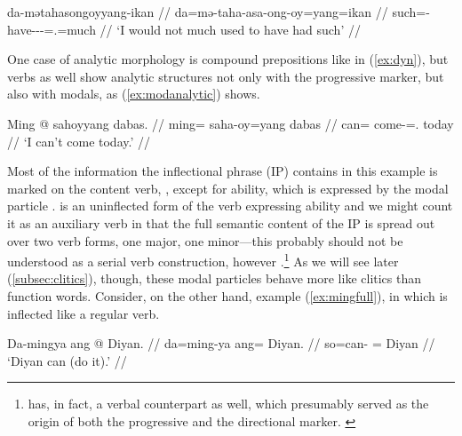 \ex\label{ex:footlong}\begingl
	\gla da-mətahasongoyyang-ikan //
	\glb da=mə-taha-asa-ong-oy=yang=ikan //
	\glc such=\Pst{}-have-\Hab{}-\Irr{}-\Neg{}=\Fsg{}.\Aarg{}=much //
	\glft `I would not much used to have had such' //
\endgl\xe

One case of analytic morphology is compound prepositions like  in (\ref{ex:dyn}), but verbs as well show analytic
structures not only with the progressive marker, but also with modals, as
(\ref{ex:modanalytic}) shows.

\ex\label{ex:modanalytic}%
\begingl
	\gla Ming @ sahoyyang dabas. //
	\glb ming= saha-oy=yang dabas //
	\glc can= come-\Neg{}=\Fsg{}.\Aarg{} today //
	\glft `I can't come today.' //
\endgl\xe

Most of the information the inflectional phrase (IP) contains in this example
is marked on the content verb, , except for ability,
which is expressed by the modal particle .  is
an uninflected form of the verb expressing ability and we might count it as an
auxiliary verb in that the full semantic content of the IP is spread out over
two verb forms, one major, one minor---this probably should not be understood
as a serial verb construction, however
\citep{aikhenvald2006}.\footnote{ has, in fact, a verbal
counterpart  as well, which presumably served
as the origin of both the progressive and the directional marker.
\label{fn:mangaverb}} As we will see later (\autoref{subsec:clitics}), though,
these modal particles behave more like clitics than function words. Consider,
on the other hand, example (\ref{ex:mingfull}), in which  is
inflected like a regular verb.

\ex\label{ex:mingfull}
\begingl
	\gla Da-mingya ang @ Diyan. //
	\glb da=ming-ya ang= Diyan. //
	\glc so=can-\TsgM{} \Aarg{}= Diyan //
	\glft `Diyan can (do it).' //
\endgl\xe

